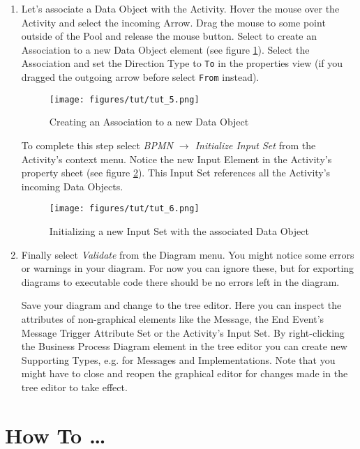 \begin{enumerate}
\item Let's associate a Data Object with the Activity. Hover the mouse over the Activity and select the incoming Arrow. Drag the mouse to some point outside of the Pool and release the mouse button. Select to create an Association to a new Data Object element (see figure \ref{fig:tut_5}). Select the Association and set the Direction Type to \texttt{To} in the properties view (if you dragged the outgoing arrow before select \texttt{From} instead).

\begin{figure}[htp]
\centering
\texttt{[image: figures/tut/tut\_5.png]}
\caption{Creating an Association to a new Data Object}
\label{fig:tut_5}
\end{figure}

To complete this step select \emph{BPMN $\rightarrow$ Initialize Input Set} from the Activity's context menu. Notice the new Input Element in the Activity's property sheet (see figure \ref{fig:tut_6}). This Input Set references all the Activity's incoming Data Objects.

\begin{figure}[htp]
\centering
\texttt{[image: figures/tut/tut\_6.png]}
\caption{Initializing a new Input Set with the associated Data Object}
\label{fig:tut_6}
\end{figure}

\item Finally select \emph{Validate} from the Diagram menu. You might notice some errors or warnings in your diagram. For now you can ignore these, but for exporting diagrams to executable code there should be no errors left in the diagram.

Save your diagram and change to the tree editor. Here you can inspect the attributes of non-graphical elements like the Message, the End Event's Message Trigger Attribute Set or the Activity's Input Set. By right-clicking the Business Process Diagram element in the tree editor you can create new Supporting Types, e.g. for Messages and Implementations. Note that you might have to close and reopen the graphical editor for changes made in the tree editor to take effect.

\end{enumerate}


\section{How To \dots}

